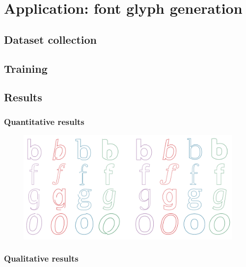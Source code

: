 \chapter{Application: font glyph generation}

\section{Dataset collection}\label{sec:font-data}

\section{Training}
\section{Results}
\subsection{Quantitative results}
\begin{figure}[t]
	\includegraphics[width=\textwidth]{figures/font_gen}
    \caption[Visual results of training ]{\label{fig:font_gen}}
\end{figure}

\subsection{Qualitative results}

